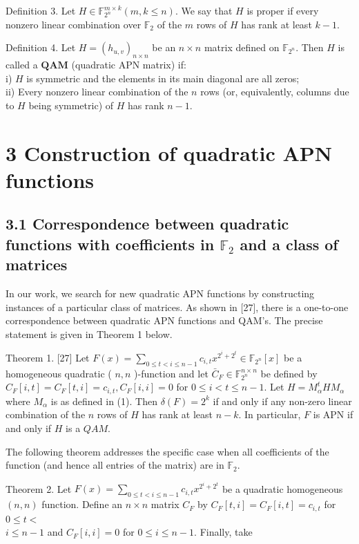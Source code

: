 \documentclass[10pt]{article}
\begin{document}
Definition 3. Let $H \in \mathbb{F}_{2^{n}}^{m \times k}(m, k \leq n)$. We say that $H$ is proper if every nonzero linear combination over $\mathbb{F}_{2}$ of the $m$ rows of $H$ has rank at least $k-1$.

Definition 4. Let $H=\left(h_{u, v}\right)_{n \times n}$ be an $n \times n$ matrix defined on $\mathbb{F}_{2^{n}}$. Then $H$ is called a $\boldsymbol{Q A M}$ (quadratic APN matrix) if:\\
i) $H$ is symmetric and the elements in its main diagonal are all zeros;\\
ii) Every nonzero linear combination of the $n$ rows (or, equivalently, columns due to $H$ being symmetric) of $H$ has rank $n-1$.

\section*{3 Construction of quadratic APN functions}
\subsection*{3.1 Correspondence between quadratic functions with coefficients in $\mathbb{F}_{2}$ and a class of matrices}
In our work, we search for new quadratic APN functions by constructing instances of a particular class of matrices. As shown in [27], there is a one-to-one correspondence between quadratic APN functions and QAM's. The precise statement is given in Theorem 1 below.

Theorem 1. [27] Let $F(x)=\sum_{0 \leq t<i \leq n-1} c_{i, t} x^{2^{i}+2^{t}} \in \mathbb{F}_{2^{n}}[x]$ be a homogeneous quadratic ( $n, n$ )-function and let $\bar{C}_{F} \in \mathbb{F}_{2^{n}}^{n \times n}$ be defined by $C_{F}[i, t]=C_{F}[t, i]= c_{i, t}, C_{F}[i, i]=0$ for $0 \leq i<t \leq n-1$. Let $H=M_{\alpha}^{t} H M_{\alpha}$ where $M_{\alpha}$ is as defined in (1). Then $\delta(F)=2^{k}$ if and only if any non-zero linear combination of the $n$ rows of $H$ has rank at least $n-k$. In particular, $F$ is APN if and only if $H$ is a $Q A M$.

The following theorem addresses the specific case when all coefficients of the function (and hence all entries of the matrix) are in $\mathbb{F}_{2}$.

Theorem 2. Let $F(x)=\sum_{0 \leq t<i \leq n-1} c_{i, t} x^{2^{i}+2^{t}}$ be a quadratic homogeneous $(n, n)$ function. Define an $n \times n$ matrix $C_{F}$ by $C_{F}[t, i]=C_{F}[i, t]=c_{i, t}$ for $0 \leq t<$\\
$i \leq n-1$ and $C_{F}[i, i]=0$ for $0 \leq i \leq n-1$. Finally, take
\end{document}
